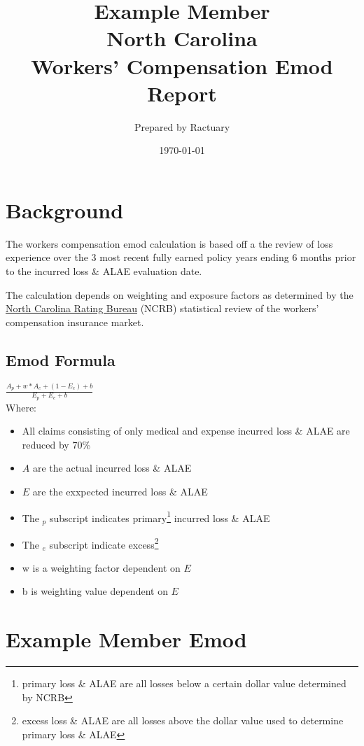 \documentclass[12pt,titlepage]{article}\usepackage[]{graphicx}\usepackage[]{color}
\makeatletter
\newenvironment{kframe}{%
 \def\at@end@of@kframe{}%
 \ifinner\ifhmode%
  \def\at@end@of@kframe{\end{minipage}}%
  \begin{minipage}{\columnwidth}%
 \fi\fi%
 \def\FrameCommand##1{\hskip\@totalleftmargin \hskip-\fboxsep
 \colorbox{shadecolor}{##1}\hskip-\fboxsep
     \hskip-\linewidth \hskip-\@totalleftmargin \hskip\columnwidth}%
 \MakeFramed {\advance\hsize-\width
   \@totalleftmargin\z@ \linewidth\hsize
   \@setminipage}}%
 {\par\unskip\endMakeFramed%
 \at@end@of@kframe}
\newenvironment{knitrout}{}{} %
\makeatother
\begin{document}
\title{Example Member \\
       North Carolina \\
       Workers' Compensation Emod Report}
\author{Prepared by Ractuary}
\date{\today}

\maketitle

\begin{knitrout}
\color{fgcolor}\begin{kframe}


{\ttfamily\noindent\color{warningcolor}{\#\# Warning in left\_join\_impl(x, y, by\$x, by\$y): joining factors with different levels, coercing to character vector}}\end{kframe}
\end{knitrout}

\section{Background}

The workers compensation emod calculation is based off a the review of loss experience over the 3 most recent fully earned policy years ending 6 months prior to the incurred loss \& ALAE evaluation date.

The calculation depends on weighting and exposure factors as determined by the \href{http://www.ncrb.org/ncrb/AboutNCRB/tabid/55/Default.aspx}{North Carolina Rating Bureau} (NCRB) statistical review of the workers' compensation insurance market.

\subsection{Emod Formula}

$\frac{A_p+w*A_e+(1-E_e)+b}{E_p+E_e+b}$ \\

Where:
\begin{itemize}
\item All claims consisting of only medical and expense incurred loss \& ALAE are reduced by 70\%
\item $A$ are the actual incurred loss \& ALAE
\item $E$ are the exxpected incurred loss \& ALAE
\item The $_p$ subscript indicates primary\footnote{primary loss \& ALAE are all losses below a certain dollar value determined by NCRB} incurred loss \& ALAE
\item The $_e$ subscript indicate excess\footnote{excess loss \& ALAE are all losses above the dollar value used to determine primary loss \& ALAE}
\item w is a weighting factor dependent on $E$
\item b is weighting value  dependent on $E$
\end{itemize}

\pagebreak

\section{Example Member Emod}


\appendix
\end{document}

